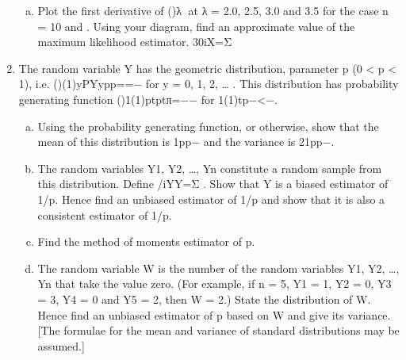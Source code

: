 \begin{enumerate}
\begin{enumerate}[(a)]
\item Plot the first derivative of ()λ􀁁 at λ = 2.0, 2.5, 3.0 and 3.5 for the case n = 10 and . Using your diagram, find an approximate value of the maximum likelihood estimator. 30iX=Σ
\end{enumerate}
\item The random variable Y has the geometric distribution, parameter p (0 < p < 1), i.e.
()(1)yPYypp==− for y = 0, 1, 2, … .
This distribution has probability generating function
()1(1)ptptπ=−− for 1(1)tp−<−.

\begin{enumerate}[(a)]
\item Using the probability generating function, or otherwise, show that the mean of this distribution is 1pp− and the variance is 21pp−.

\item The random variables Y1, Y2, …, Yn constitute a random sample from this distribution.
Define /iYY=Σ . Show that Y is a biased estimator of 1/p. Hence find an unbiased estimator of 1/p and show that it is also a consistent estimator of 1/p.
\item Find the method of moments estimator of p.

\item The random variable W is the number of the random variables Y1, Y2, …, Yn that take the value zero. (For example, if n = 5, Y1 = 1, Y2 = 0, Y3 = 3, Y4 = 0 and Y5 = 2, then W = 2.) State the distribution of W. Hence find an unbiased estimator of p based on W and give its variance. [The formulae for the mean and variance of standard distributions may be assumed.]
\end{enumerate}
\end{enumerate}


